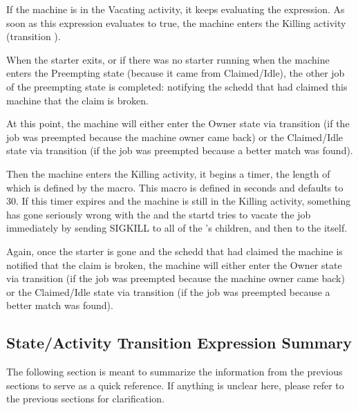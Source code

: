 If the machine is in the Vacating activity, it keeps evaluating the 
 expression.  As soon as this expression evaluates to true,
the machine enters the Killing activity (transition ).

When the starter exits, or if there was no starter running when the
machine enters the Preempting state (because it came from
Claimed/Idle), the other job of the preempting state is completed:
notifying the schedd that had claimed this machine that the claim is
broken.

At this point, the machine will either enter the Owner state via
transition  (if the job was preempted because the machine
owner came back) or the Claimed/Idle state via transition 
(if the job was preempted because a better match was found).

Then the machine enters the Killing activity, it begins a timer, the
length of which is defined by the 
\label{param:KillingTimeout} macro.  This macro is defined in seconds 
and defaults to 30.  If this timer expires and the machine is still in
the Killing activity, something has gone seriously wrong with the
 and the startd tries to vacate the job immediately by
sending SIGKILL to all of the 's children, and then to
the  itself.

Again, once the starter is gone and the schedd that had claimed the
machine is notified that the claim is broken, the machine will either
enter the Owner state via transition  (if the job was
preempted because the machine owner came back) or the Claimed/Idle
state via transition  (if the job was preempted because a
better match was found). 

\subsection{\label{sec:State-Expression-Summary}
State/Activity Transition Expression Summary}
The following section is meant to summarize the information from the
previous sections to serve as a quick reference.  If anything is
unclear here, please refer to the previous sections for clarification.

